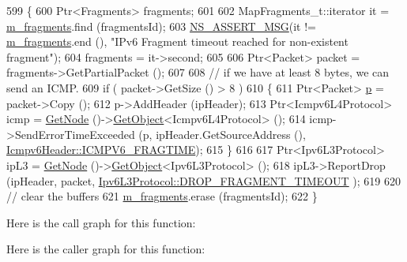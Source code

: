 \begin{DoxyCode}
599 \{
600   Ptr<Fragments> fragments;
601 
602   MapFragments\_t::iterator it = \hyperlink{classns3_1_1Ipv6ExtensionFragment_aa830df260b53ecc85fd602a558232f7f}{m\_fragments}.find (fragmentsId);
603   \hyperlink{assert_8h_aff5ece9066c74e681e74999856f08539}{NS\_ASSERT\_MSG}(it != \hyperlink{classns3_1_1Ipv6ExtensionFragment_aa830df260b53ecc85fd602a558232f7f}{m\_fragments}.end (), \textcolor{stringliteral}{"IPv6 Fragment timeout reached for
       non-existent fragment"});
604   fragments = it->second;
605 
606   Ptr<Packet> packet = fragments->GetPartialPacket ();
607 
608   \textcolor{comment}{// if we have at least 8 bytes, we can send an ICMP.}
609   \textcolor{keywordflow}{if} ( packet->GetSize () > 8 )
610     \{
611       Ptr<Packet> \hyperlink{lte__link__budget_8m_ac9de518908a968428863f829398a4e62}{p} = packet->Copy ();
612       p->AddHeader (ipHeader);
613       Ptr<Icmpv6L4Protocol> icmp = \hyperlink{classns3_1_1Ipv6Extension_a71cc2e202ef7605b1f645d8c6a384657}{GetNode} ()->\hyperlink{classns3_1_1Object_a13e18c00017096c8381eb651d5bd0783}{GetObject}<Icmpv6L4Protocol> ();
614       icmp->SendErrorTimeExceeded (p, ipHeader.GetSourceAddress (), 
      \hyperlink{classns3_1_1Icmpv6Header_a643af752203ad4456f89d3d1ab49943aa5798a6dc190dfc603258e1313a4266a1}{Icmpv6Header::ICMPV6\_FRAGTIME});
615     \}
616 
617   Ptr<Ipv6L3Protocol> ipL3 = \hyperlink{classns3_1_1Ipv6Extension_a71cc2e202ef7605b1f645d8c6a384657}{GetNode} ()->\hyperlink{classns3_1_1Object_a13e18c00017096c8381eb651d5bd0783}{GetObject}<Ipv6L3Protocol> ();
618   ipL3->ReportDrop (ipHeader, packet, \hyperlink{classns3_1_1Ipv6L3Protocol_a33c64db9bc35f71ff368b132bfffa37aa27ee7f562d7201ffd26f3e08bf620d0a}{Ipv6L3Protocol::DROP\_FRAGMENT\_TIMEOUT}
      );
619 
620   \textcolor{comment}{// clear the buffers}
621   \hyperlink{classns3_1_1Ipv6ExtensionFragment_aa830df260b53ecc85fd602a558232f7f}{m\_fragments}.erase (fragmentsId);
622 \}
\end{DoxyCode}


Here is the call graph for this function\+:




Here is the caller graph for this function\+:


